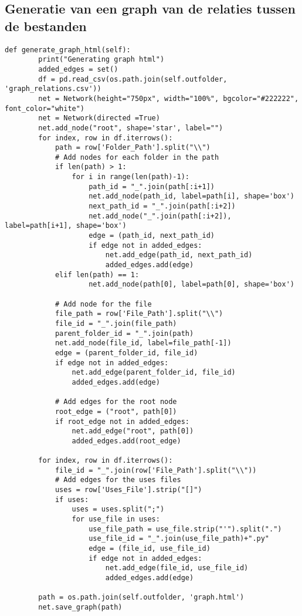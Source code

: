 \subsection{Generatie van een graph van de relaties tussen de bestanden}
\label{bijlage:generate-file-graph}

\begin{verbatim}
def generate_graph_html(self):
        print("Generating graph html")
        added_edges = set()
        df = pd.read_csv(os.path.join(self.outfolder, 'graph_relations.csv'))
        net = Network(height="750px", width="100%", bgcolor="#222222", font_color="white") 
        net = Network(directed =True)
        net.add_node("root", shape='star', label="")     
        for index, row in df.iterrows():
            path = row['Folder_Path'].split("\\")
            # Add nodes for each folder in the path
            if len(path) > 1:
                for i in range(len(path)-1):
                    path_id = "_".join(path[:i+1])
                    net.add_node(path_id, label=path[i], shape='box')
                    next_path_id = "_".join(path[:i+2])
                    net.add_node("_".join(path[:i+2]), label=path[i+1], shape='box')                        
                    edge = (path_id, next_path_id)
                    if edge not in added_edges:
                        net.add_edge(path_id, next_path_id)
                        added_edges.add(edge)
            elif len(path) == 1:
                    net.add_node(path[0], label=path[0], shape='box')

            # Add node for the file
            file_path = row['File_Path'].split("\\")
            file_id = "_".join(file_path)
            parent_folder_id = "_".join(path)
            net.add_node(file_id, label=file_path[-1])
            edge = (parent_folder_id, file_id)
            if edge not in added_edges:
                net.add_edge(parent_folder_id, file_id)
                added_edges.add(edge)

            # Add edges for the root node
            root_edge = ("root", path[0])
            if root_edge not in added_edges:
                net.add_edge("root", path[0])
                added_edges.add(root_edge)
        
        for index, row in df.iterrows():
            file_id = "_".join(row['File_Path'].split("\\"))
            # Add edges for the uses files
            uses = row['Uses_File'].strip("[]")
            if uses:
                uses = uses.split(";")
                for use_file in uses:
                    use_file_path = use_file.strip("'").split(".")
                    use_file_id = "_".join(use_file_path)+".py"
                    edge = (file_id, use_file_id)
                    if edge not in added_edges:
                        net.add_edge(file_id, use_file_id)
                        added_edges.add(edge)

        path = os.path.join(self.outfolder, 'graph.html')
        net.save_graph(path)
\end{verbatim}

